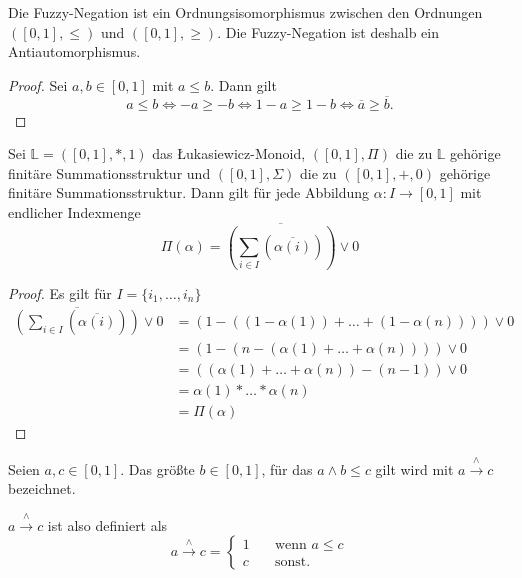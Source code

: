 \documentclass{article}
\begin{document}
\begin{theorem}
  Die Fuzzy-Negation ist ein Ordnungsisomorphismus zwischen den Ordnungen $([0, 1], \leq)$ und $([0, 1], \geq)$.
  Die Fuzzy-Negation ist deshalb ein Antiautomorphismus.
\end{theorem}
\begin{proof}
  Sei $a, b \in [0, 1]$ mit $a \leq b$.
  Dann gilt
  \begin{equation*}
    a \leq b \iff -a \geq -b \iff 1 - a \geq 1 - b \iff \overline{a} \geq \overline{b}.
  \end{equation*}
\end{proof}

\begin{theorem}
  Sei $\mathbb{L} = ([0, 1], \ast, 1)$ das Łukasiewicz-Monoid,
  $([0, 1], \Pi)$ die zu $\mathbb{L}$ gehörige finitäre Summationsstruktur
  und $([0, 1], \Sigma)$ die zu $([0, 1], +, 0)$ gehörige finitäre Summationsstruktur.
  Dann gilt für jede Abbildung $\alpha \colon I \to [0, 1]$
  mit endlicher Indexmenge
  \begin{equation*}
    \Pi(\alpha) = \overline{(\sum_{i \in I}(\overline{\alpha(i)}))} \vee 0
  \end{equation*}
\end{theorem}
\begin{proof}
  Es gilt für $I = \{i_1, \dots, i_n\}$
  \begin{align*}
    \overline{(\sum_{i \in I}(\overline{\alpha(i)}))} \vee 0
    &= (1-((1 - \alpha(1)) + \dots + (1 - \alpha(n)))) \vee 0 \\
    &= (1 - (n - (\alpha(1) + \dots + \alpha(n)))) \vee 0 \\
    &= ((\alpha(1) + \dots + \alpha(n)) - (n - 1)) \vee 0 \\
    &= \alpha(1) \ast \dots \ast \alpha(n) \\
    &= \Pi(\alpha)
  \end{align*}
\end{proof}

\begin{definition}
  Seien $a, c \in [0, 1]$. Das größte $b \in [0, 1]$, für das $a \wedge b \leq c$ gilt wird mit $a \overset{\wedge}{\rightarrow} c$ bezeichnet.

  $a \overset{\wedge}{\rightarrow} c$ ist also definiert als 
  \[   
  a \overset{\wedge}{\rightarrow} c = 
    \begin{cases}
      1 &\quad\text{wenn } a \leq c \\
      c &\quad\text{sonst.}
    \end{cases}
  \]
\end{definition}
\end{document}
